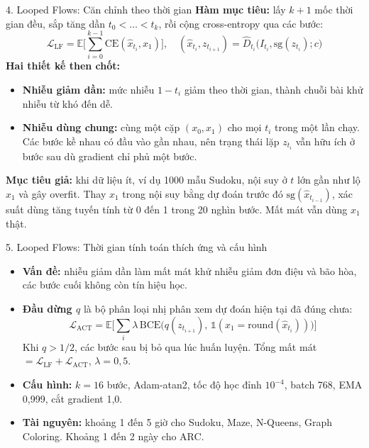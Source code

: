 \begin{frame}{4. Looped Flows: Căn chỉnh theo thời gian}
    \textbf{Hàm mục tiêu:} lấy $k+1$ mốc thời gian đều, sắp tăng dần $t_0 < \dots < t_k$, rồi cộng cross-entropy qua các bước:
    $$\mathcal{L}_{\text{LF}} = \mathbb{E}\Big[\sum_{i=0}^{k-1} \mathrm{CE}(\hat{x}_{t_i}, x_1)\Big], \quad (\hat{x}_{t_i}, z_{t_{i+1}}) = \hat{D}_{t_i}\big(I_{t_i}, \mathrm{sg}(z_{t_i}); c\big)$$
    \textbf{Hai thiết kế then chốt:}
    \begin{itemize}
        \item \textbf{Nhiễu giảm dần:} mức nhiễu $1 - t_i$ giảm theo thời gian, thành chuỗi bài khử nhiễu từ khó đến dễ.
        \item \textbf{Nhiễu dùng chung:} cùng một cặp $(x_0, x_1)$ cho mọi $t_i$ trong một lần chạy. Các bước kề nhau có đầu vào gần nhau, nên trạng thái lặp $z_{t_i}$ vẫn hữu ích ở bước sau dù gradient chỉ phủ một bước.
    \end{itemize}
    \textbf{Mục tiêu giả:} khi dữ liệu ít, ví dụ 1000 mẫu Sudoku, nội suy ở $t$ lớn gần như lộ $x_1$ và gây overfit. Thay $x_1$ trong nội suy bằng dự đoán trước đó $\mathrm{sg}(\hat{x}_{t_{i-1}})$, xác suất dùng tăng tuyến tính từ 0 đến 1 trong 20 nghìn bước. Mất mát vẫn dùng $x_1$ thật.
\end{frame}

\begin{frame}{5. Looped Flows: Thời gian tính toán thích ứng và cấu hình}
    \begin{itemize}
        \item \textbf{Vấn đề:} nhiễu giảm dần làm mất mát khử nhiễu giảm đơn điệu và bão hòa, các bước cuối không còn tín hiệu học.
        \item \textbf{Đầu dừng $q$} là bộ phân loại nhị phân xem dự đoán hiện tại đã đúng chưa:
        $$\mathcal{L}_{\text{ACT}} = \mathbb{E}\Big[\sum_{i} \lambda\,\mathrm{BCE}\big(q(z_{t_{i+1}}),\, \mathbb{1}(x_1 = \mathrm{round}(\hat{x}_{t_i}))\big)\Big]$$
        Khi $q > 1/2$, các bước sau bị bỏ qua lúc huấn luyện. Tổng mất mát $= \mathcal{L}_{\text{LF}} + \mathcal{L}_{\text{ACT}}$, $\lambda = 0{,}5$.
        \item \textbf{Cấu hình:} $k = 16$ bước, Adam-atan2, tốc độ học đỉnh $10^{-4}$, batch 768, EMA 0,999, cắt gradient 1,0.
        \item \textbf{Tài nguyên:} khoảng 1 đến 5 giờ cho Sudoku, Maze, N-Queens, Graph Coloring. Khoảng 1 đến 2 ngày cho ARC.
    \end{itemize}
\end{frame}

